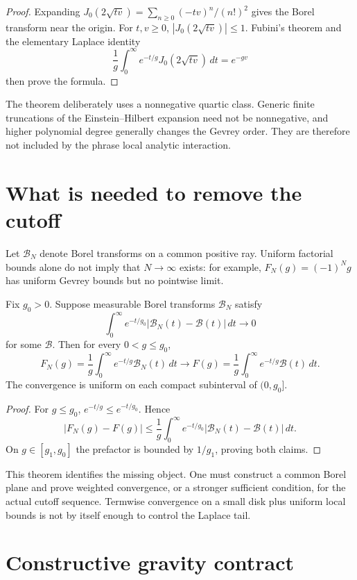 \documentclass[11pt]{article}
\begin{document}
\begin{proof}
Expanding $J_0(2\sqrt{tv})=\sum_{n\geq0}(-tv)^n/(n!)^2$ gives the
Borel transform near the origin. For $t,v\geq0$, $|J_0(2\sqrt{tv})|\leq1$.
Fubini's theorem and the elementary Laplace identity
\[
 \frac1g\int_0^\infty e^{-t/g}J_0(2\sqrt{tv})\,dt=e^{-gv}
\]
then prove the formula.
\end{proof}

The theorem deliberately uses a nonnegative quartic class. Generic finite
truncations of the Einstein--Hilbert expansion need not be nonnegative, and higher
polynomial degree generally changes the Gevrey order. They are therefore not
included by the phrase local analytic interaction.

\section{What is needed to remove the cutoff}

Let $\mathcal B_N$ denote Borel transforms on a common positive ray. Uniform
factorial bounds alone do not imply that $N\to\infty$ exists: for example,
$F_N(g)=(-1)^Ng$ has uniform Gevrey bounds but no pointwise limit.

\begin{theorem}\label{thm:removal}
Fix $g_0>0$. Suppose measurable Borel transforms $\mathcal B_N$ satisfy
\[
 \int_0^\infty e^{-t/g_0}|\mathcal B_N(t)-\mathcal B(t)|\,dt
 \longrightarrow0
\]
for some $\mathcal B$. Then for every $0<g\leq g_0$,
\[
 F_N(g)=\frac1g\int_0^\infty e^{-t/g}\mathcal B_N(t)\,dt
 \longrightarrow
 F(g)=\frac1g\int_0^\infty e^{-t/g}\mathcal B(t)\,dt.
\]
The convergence is uniform on each compact subinterval of $(0,g_0]$.
\end{theorem}

\begin{proof}
For $g\leq g_0$, $e^{-t/g}\leq e^{-t/g_0}$. Hence
\[
 |F_N(g)-F(g)|\leq
 \frac1g\int_0^\infty e^{-t/g_0}
 |\mathcal B_N(t)-\mathcal B(t)|\,dt.
\]
On $g\in[g_1,g_0]$ the prefactor is bounded by $1/g_1$, proving both claims.
\end{proof}

This theorem identifies the missing object. One must construct a common Borel plane
and prove weighted convergence, or a stronger sufficient condition, for the actual
cutoff sequence. Termwise convergence on a small disk plus uniform local bounds is
not by itself enough to control the Laplace tail.

\section{Constructive gravity contract}
\end{document}
